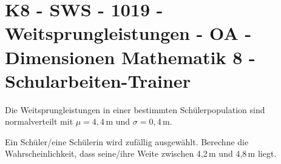 \section{K8 - SWS - 1019 - Weitsprungleistungen - OA - Dimensionen Mathematik 8 - Schularbeiten-Trainer}

\begin{beispiel}[K8 - SWS]{1}
Die Weitsprungleistungen in einer bestimmten Schülerpopulation sind normalverteilt mit $\mu=4,4$\,m und $\sigma=0,4$\,m.

Ein Schüler/eine Schülerin wird zufällig ausgewählt. Berechne die Wahrscheinlichkeit, dass seine/ihre Weite zwischen 4,2\,m und 4,8\,m liegt.

\end{beispiel}